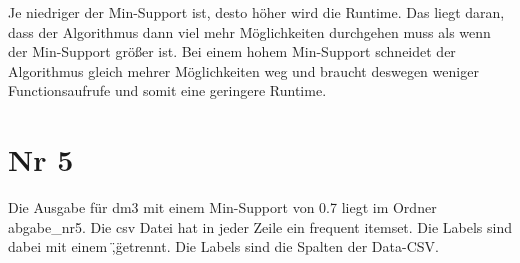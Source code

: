 \documentclass{article}
\begin{document}
Je niedriger der Min-Support ist, desto höher wird die Runtime. Das liegt daran, dass der Algorithmus dann viel mehr Möglichkeiten durchgehen muss als wenn der Min-Support größer ist. Bei einem hohem Min-Support schneidet der Algorithmus gleich mehrer Möglichkeiten weg und braucht deswegen weniger Functionsaufrufe und somit eine geringere Runtime.

\section{Nr 5}
Die Ausgabe für dm3 mit einem Min-Support von 0.7 liegt im Ordner abgabe\_nr5. Die csv Datei hat in jeder Zeile ein frequent itemset. Die Labels sind dabei mit einem \",\" getrennt. Die Labels sind die Spalten der Data-CSV.
\end{document}
